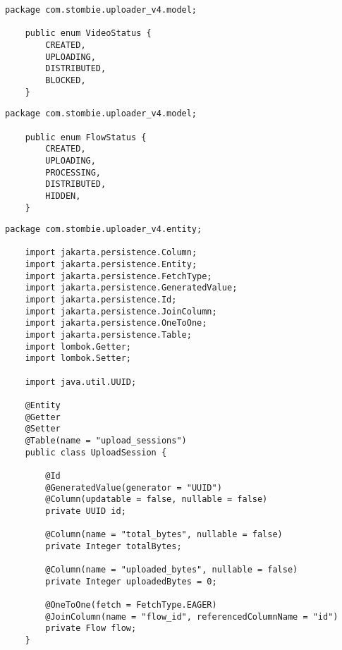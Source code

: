 \begin{lstlisting}[caption={VideoStatus.java}]
	package com.stombie.uploader_v4.model;
	
	public enum VideoStatus {
		CREATED,
		UPLOADING,
		DISTRIBUTED,
		BLOCKED,
	}
\end{lstlisting}

\begin{lstlisting}[caption={FlowStatus.java}]
	package com.stombie.uploader_v4.model;
	
	public enum FlowStatus {
		CREATED,
		UPLOADING,
		PROCESSING,
		DISTRIBUTED,
		HIDDEN,
	}
\end{lstlisting}

\begin{lstlisting}[caption={UploadSession.java}]
	package com.stombie.uploader_v4.entity;
	
	import jakarta.persistence.Column;
	import jakarta.persistence.Entity;
	import jakarta.persistence.FetchType;
	import jakarta.persistence.GeneratedValue;
	import jakarta.persistence.Id;
	import jakarta.persistence.JoinColumn;
	import jakarta.persistence.OneToOne;
	import jakarta.persistence.Table;
	import lombok.Getter;
	import lombok.Setter;
	
	import java.util.UUID;
	
	@Entity
	@Getter
	@Setter
	@Table(name = "upload_sessions")
	public class UploadSession {
		
		@Id
		@GeneratedValue(generator = "UUID")
		@Column(updatable = false, nullable = false)
		private UUID id;
		
		@Column(name = "total_bytes", nullable = false)
		private Integer totalBytes;
		
		@Column(name = "uploaded_bytes", nullable = false)
		private Integer uploadedBytes = 0;
		
		@OneToOne(fetch = FetchType.EAGER)
		@JoinColumn(name = "flow_id", referencedColumnName = "id")
		private Flow flow;
	}
\end{lstlisting}

